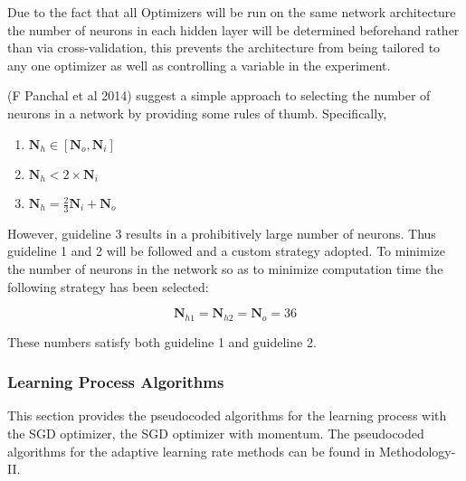 \documentclass{article}
\begin{document}
 Due to the fact that all Optimizers will be run on the same network architecture the number of neurons in each hidden layer will be determined beforehand rather than via cross-validation, this prevents the architecture from being tailored to any one optimizer as well as controlling a variable in the experiment.
 
 (F Panchal et al 2014) suggest a simple approach to selecting the number of neurons in a network by providing some rules of thumb. Specifically,
\begin{enumerate}
	\item	$\boldsymbol{N}_h\in[\boldsymbol{N}_o, \boldsymbol{N}_i]$
	
	\item$\boldsymbol{N}_h < 2\times\boldsymbol{N}_i$
	
	\item$\boldsymbol{N}_h = \frac{2}{3}\boldsymbol{N}_i + \boldsymbol{N}_o$
\end{enumerate}
 
 However, guideline 3 results in a prohibitively large number of neurons. Thus guideline 1 and 2 will be followed and a custom strategy adopted.
 To minimize the number of neurons in the network so as to minimize computation time the following strategy has been selected:
 
 \begin{equation}
 	\boldsymbol{N}_{h1} = \boldsymbol{N}_{h2} = \boldsymbol{N}_o = 36
 \end{equation}

These numbers satisfy both guideline 1 and guideline 2.


\subsubsection{Learning Process Algorithms}
This section provides the pseudocoded algorithms for the learning process with the SGD optimizer, the SGD optimizer with momentum. The pseudocoded algorithms for the adaptive learning rate methods can be found in Methodology-II.
\end{document}
